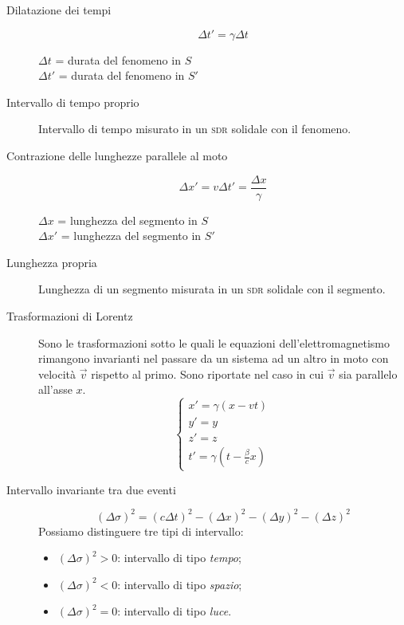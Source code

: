\documentclass[a4paper,11pt,italian]{article}
\begin{document}
\begin{description}
  \item[Dilatazione dei tempi]
  \[ \Delta t' = \gamma \Delta t \]
  \begin{multicols}{2}
  $ \Delta t $ = durata del fenomeno in $ S $\\
  $ \Delta t' $ = durata del fenomeno in $ S' $
  \end{multicols}
  
  \item[Intervallo di tempo proprio]
  Intervallo di tempo misurato in un \textsc{sdr} solidale con il fenomeno.
  
  \item[Contrazione delle lunghezze parallele al moto] 
  \[ \Delta x' = v \Delta t' = \frac{\Delta x}{\gamma} \]
  \begin{multicols}{2}
  $ \Delta x $ = lunghezza del segmento in $ S $\\
  $ \Delta x' $ = lunghezza del segmento in $ S' $
  \end{multicols}
  
  \item[Lunghezza propria] Lunghezza di un segmento misurata in un \textsc{sdr} solidale con il segmento.
  
  \item[Trasformazioni di Lorentz]
  Sono le trasformazioni sotto le quali le equazioni dell'elettromagnetismo rimangono invarianti nel passare da un sistema ad un altro in moto con velocità $ \vec{v} $ rispetto al primo.
  Sono riportate nel caso in cui $ \vec{v} $ sia parallelo all'asse $ x $.
  \[
  \left\{ 
  \begin{array}{l}
  x' = \gamma (x -vt) \\ 
  y' = y \\ 
  z' = z \\
  t' = \gamma \left(  t - \frac{\beta}{c}x  \right)
  \end{array}
  \right. 
  \]
  \item[Intervallo invariante tra due eventi] 
  \[ (\Delta \sigma)^2 = (c\Delta t)^2 - (\Delta x)^2 - (\Delta y)^2 - (\Delta z)^2 \]
  Possiamo distinguere tre tipi di intervallo:
  \begin{itemize}
    \item $ (\Delta \sigma)^2 > 0 $: intervallo di tipo \emph{tempo};
    \item $ (\Delta \sigma)^2 < 0 $: intervallo di tipo \emph{spazio};
    \item $ (\Delta \sigma)^2 = 0 $: intervallo di tipo \emph{luce}.
  \end{itemize}
  

\end{description}
\end{document}
